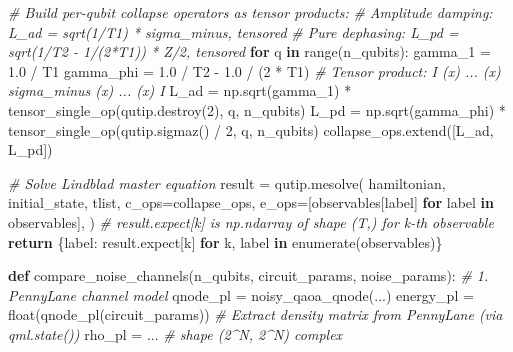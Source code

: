 \documentclass[
  11pt,
]{report}
\newenvironment{Shaded}{}{}
\newcommand{\BuiltInTok}[1]{\textcolor[rgb]{0.00,0.50,0.00}{#1}}
\newcommand{\CommentTok}[1]{\textcolor[rgb]{0.38,0.63,0.69}{\textit{#1}}}
\newcommand{\ControlFlowTok}[1]{\textcolor[rgb]{0.00,0.44,0.13}{\textbf{#1}}}
\newcommand{\DecValTok}[1]{\textcolor[rgb]{0.25,0.63,0.44}{#1}}
\newcommand{\FloatTok}[1]{\textcolor[rgb]{0.25,0.63,0.44}{#1}}
\newcommand{\KeywordTok}[1]{\textcolor[rgb]{0.00,0.44,0.13}{\textbf{#1}}}
\newcommand{\NormalTok}[1]{#1}
\newcommand{\OperatorTok}[1]{\textcolor[rgb]{0.40,0.40,0.40}{#1}}
\begin{document}
\begin{Shaded}
\begin{Highlighting}[]
    \CommentTok{\# Build per{-}qubit collapse operators as tensor products:}
    \CommentTok{\#   Amplitude damping: L\_ad = sqrt(1/T1) * sigma\_minus, tensored}
    \CommentTok{\#   Pure dephasing:    L\_pd = sqrt(1/T2 {-} 1/(2*T1)) * Z/2, tensored}
    \ControlFlowTok{for}\NormalTok{ q }\KeywordTok{in} \BuiltInTok{range}\NormalTok{(n\_qubits):}
\NormalTok{        gamma\_1 }\OperatorTok{=} \FloatTok{1.0} \OperatorTok{/}\NormalTok{ T1}
\NormalTok{        gamma\_phi }\OperatorTok{=} \FloatTok{1.0} \OperatorTok{/}\NormalTok{ T2 }\OperatorTok{{-}} \FloatTok{1.0} \OperatorTok{/}\NormalTok{ (}\DecValTok{2} \OperatorTok{*}\NormalTok{ T1)}
        \CommentTok{\# Tensor product: I (x) ... (x) sigma\_minus (x) ... (x) I}
\NormalTok{        L\_ad }\OperatorTok{=}\NormalTok{ np.sqrt(gamma\_1) }\OperatorTok{*}\NormalTok{ tensor\_single\_op(qutip.destroy(}\DecValTok{2}\NormalTok{), q, n\_qubits)}
\NormalTok{        L\_pd }\OperatorTok{=}\NormalTok{ np.sqrt(gamma\_phi) }\OperatorTok{*}\NormalTok{ tensor\_single\_op(qutip.sigmaz() }\OperatorTok{/} \DecValTok{2}\NormalTok{, q, n\_qubits)}
\NormalTok{        collapse\_ops.extend([L\_ad, L\_pd])}

    \CommentTok{\# Solve Lindblad master equation}
\NormalTok{    result }\OperatorTok{=}\NormalTok{ qutip.mesolve(}
\NormalTok{        hamiltonian, initial\_state, tlist,}
\NormalTok{        c\_ops}\OperatorTok{=}\NormalTok{collapse\_ops,}
\NormalTok{        e\_ops}\OperatorTok{=}\NormalTok{[observables[label] }\ControlFlowTok{for}\NormalTok{ label }\KeywordTok{in}\NormalTok{ observables],}
\NormalTok{    )}
    \CommentTok{\# result.expect[k] is np.ndarray of shape (T,) for k{-}th observable}
    \ControlFlowTok{return}\NormalTok{ \{label: result.expect[k] }\ControlFlowTok{for}\NormalTok{ k, label }\KeywordTok{in} \BuiltInTok{enumerate}\NormalTok{(observables)\}}


\KeywordTok{def}\NormalTok{ compare\_noise\_channels(n\_qubits, circuit\_params, noise\_params):}
    \CommentTok{\# 1. PennyLane channel model}
\NormalTok{    qnode\_pl }\OperatorTok{=}\NormalTok{ noisy\_qaoa\_qnode(...)}
\NormalTok{    energy\_pl }\OperatorTok{=} \BuiltInTok{float}\NormalTok{(qnode\_pl(circuit\_params))}
    \CommentTok{\# Extract density matrix from PennyLane (via qml.state())}
\NormalTok{    rho\_pl }\OperatorTok{=}\NormalTok{ ...                         }\CommentTok{\# shape (2\^{}N, 2\^{}N) complex}


\end{Highlighting}
\end{Shaded}
\end{document}
